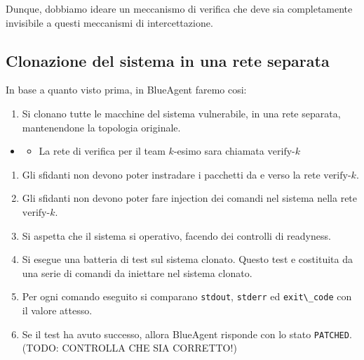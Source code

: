 Dunque, dobbiamo ideare un meccanismo di verifica che deve sia
completamente invisibile a questi meccanismi di intercettazione.

\subsection{Clonazione del sistema in una rete
separata}\label{clonazione-del-sistema-in-una-rete-separata}

In base a quanto visto prima, in BlueAgent faremo cosi:

\begin{enumerate}
\def\labelenumi{\arabic{enumi}.}
\tightlist
\item
  Si clonano tutte le macchine del sistema vulnerabile, in una rete
  separata, mantenendone la topologia originale.
\end{enumerate}

\begin{itemize}
\tightlist
\item
  \begin{itemize}
  \tightlist
  \item
    La rete di verifica per il team \(k\)-esimo sara\textquotesingle{}
    chiamata \(\text{verify-}k\)
  \end{itemize}
\end{itemize}

\begin{enumerate}
\def\labelenumi{\arabic{enumi}.}
\setcounter{enumi}{1}
\tightlist
\item
  Gli sfidanti non devono poter instradare i pacchetti da e verso la
  rete \(\text{verify-}k\).
\item
  Gli sfidanti non devono poter fare injection dei comandi nel sistema
  nella rete \(\text{verify-}k\).
\item
  Si aspetta che il sistema si operativo, facendo dei controlli di
  readyness.
\item
  Si esegue una batteria di test sul sistema clonato. Questo test
  e\textquotesingle{} costituita da una serie di comandi da iniettare
  nel sistema clonato.
\item
  Per ogni comando eseguito si comparano
  \passthrough{\lstinline!stdout!}, \passthrough{\lstinline!stderr!} ed
  \passthrough{\lstinline!exit\_code!} con il valore attesso.
\item
  Se il test ha avuto successo, allora BlueAgent risponde con lo stato
  \passthrough{\lstinline!PATCHED!}. (TODO: CONTROLLA CHE SIA CORRETTO!)
\end{enumerate}
